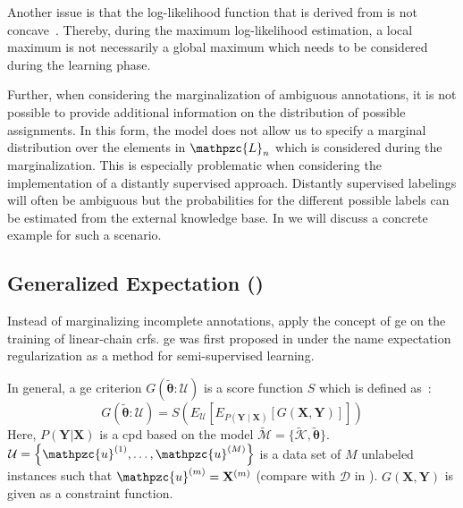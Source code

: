 Another issue is that the log-likelihood function that is derived from  is not concave~\citep{tsuboi2008training}.
Thereby, during the maximum log-likelihood estimation, a local maximum is not necessarily a global maximum which needs to be considered during the learning phase.

Further, when considering the marginalization of ambiguous annotations, it is not possible to provide additional information on the distribution of possible assignments.
In this form, the model does not allow us to specify a \gls{marginal distribution} over the elements in $\mathpzc{L}_n$ which is considered during the marginalization.
This is especially problematic when considering the implementation of a distantly supervised approach.
Distantly supervised labelings will often be ambiguous but the probabilities for the different possible labels can be estimated from the external knowledge base.
In  we will discuss a concrete example for such a scenario.

\subsection{Generalized Expectation ()}

Instead of marginalizing incomplete annotations, \citet{mann2008generalized} apply the concept of \acrfull{ge} on the training of linear-chain \glspl{crf}.
\Gls{ge} was first proposed in \citet{mann2007simple} under the name \gls{expectation regularization} as a method for semi-supervised learning.

In general, a \gls{ge} criterion $G(\bm{\tilde{\theta}}:\mathcal{U})$ is a score function $S$ which is defined as~\citep{mann2010generalized}:
\begin{equation}
  \label{equ:generalized-expectation}
  G(\bm{\tilde{\theta}}:\mathcal{U})=S\left(E_{\mathcal{U}}\left[E_{P(\mathbf{Y}\mid\mathbf{X})}\left[G(\mathbf{X},\mathbf{Y})\right]\right]\right)
\end{equation}
Here, $P(\mathbf{Y}|\mathbf{X})$ is a \gls{cpd} based on the model $\tilde{\mathcal{M}}=\{\tilde{\mathcal{K}},\bm{\tilde{\theta}}\}$.
$\mathcal{U}=\left\{\mathpzc{u}^{(1)},\dots,\mathpzc{u}^{(M)}\right\}$ is a data set of $M$ unlabeled instances such that $\mathpzc{u}^{(m)}=\mathbf{X}^{(m)}$ (compare with $\mathcal{D}$ in ).
$G(\mathbf{X},\mathbf{Y})$ is given as a constraint function.

\bigskip

